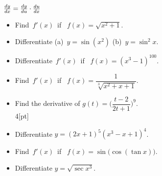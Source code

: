  \begin{frame}[fragile] \frametitle{}

$\frac{d {y} }{d x} = \frac{d y}{d u} \cdot \frac{d {u} }{d x} $

\begin{itemize}
	\item Find\ $f'(x)$\ if \ $f(x)=\sqrt{x^2+1}$. \\
	\item Differentiate\; (a)\ $y=\sin (x^2)$ \quad  (b)\ $y=\sin^2 x$.
	\item Differentiate\ $f'(x)$\ if \ $f(x)=(x^3-1)^{100}$. \\
	\item Find\  $f'(x)$\ if \ $f(x)=\dfrac{1}{\sqrt[3]{x^2+x+1}}$. 
\end{itemize}


\begin{itemize}
	\item Find the derivative of\; $g(t)= \big( \dfrac{t-2}{2t+1} \big)^9$.\\4[pt]
	\item Differentiate\; $y=(2x+1)^5(x^3-x+1)^4$. \\
	\item Find\  $f'(x)$\ if \ $f(x)=\sin \big( \cos ( \tan x ) \big)$. 
	\item Differentiate\; $y=\sqrt{\sec x^3}$.	
\end{itemize}


\end{frame}




